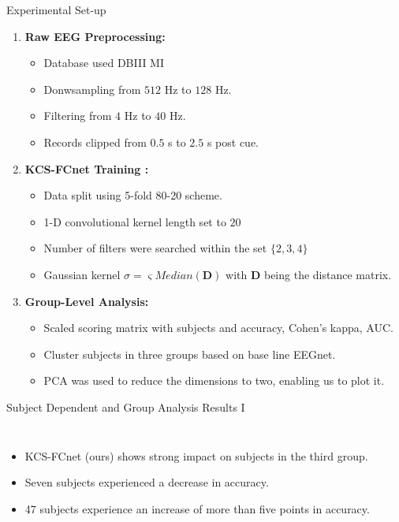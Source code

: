 \documentclass[aspectratio=169]{beamer}
\let\oldcite\cite %
\renewcommand{\cite}[1]{{\tiny\oldcite{#1}}}
\newcommand{\mat}[1]{\bm {#1}}
\begin{document}
\begin{frame}{Experimental Set-up}
    \begin{enumerate}
        \item \textbf{Raw EEG Preprocessing:} 
        \begin{itemize}
            \item Database used DBIII MI
            \item Donwsampling from $512$ Hz to $128$ Hz. 
            \item Filtering from $4$ Hz to $40$ Hz. 
            \item Records clipped from $0.5$ s to $2.5$ s post cue.
        \end{itemize}
        \item \textbf{KCS-FCnet Training \cite{lawhern2018eegnet, schirrmeister2017deep}:}
        \begin{itemize}
            \item Data split using 5-fold 80-20 scheme.
            \item 1-D convolutional kernel length set to $20$
            \item Number of filters were searched within the set $\{2,3,4\}$
            \item Gaussian kernel $\sigma=\varsigma  Median( \mat{D} ) $ with $\mat{D}$ being the distance matrix. 
        \end{itemize}
        \item \textbf{Group-Level Analysis:}
        \begin{itemize}
            \item Scaled scoring matrix with subjects and accuracy, Cohen's kappa, AUC.
            \item Cluster subjects in three groups based on base line EEGnet.
            \item PCA was used to reduce the dimensions to two, enabling us to plot it.
        \end{itemize}
    \end{enumerate}
\end{frame}

\begin{frame}{Subject Dependent and Group Analysis Results I}
    \begin{columns}
            \centering
            \resizebox{1\linewidth}{!}{}
        \begin{itemize}
            \item KCS-FCnet (ours) shows strong impact on subjects in the third group.
            \item Seven subjects experienced a decrease in accuracy.
            \item 47 subjects experience an increase of more than five points in accuracy.
        \end{itemize}
    \end{columns}

\end{frame}
\end{document}
